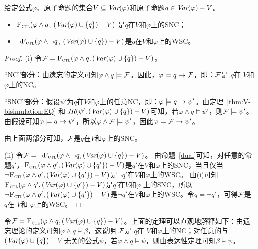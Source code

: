 \begin{theorem}\label{thm:SNC:WSC:forget}
	给定公式$\varphi$、原子命题的集合$V\subseteq\textit{Var}(\varphi)$和原子命题$q\in\textit{Var}(\varphi)- V$。
	\begin{itemize}
		\item[(i)] ${\textsc{F}_{\textsc{ctl}}} (\varphi \land q$, $(\textit{Var}(\varphi) \cup \{q\}) - V)$ 是$q$在$V$和$\varphi$上的SNC；
		\item[(ii)]  $\neg{\textsc{F}_{\textsc{ctl}}} (\varphi \land \neg q$, $(\textit{Var}(\varphi) \cup \{q\}) - V)$是$q$在$V$和$\varphi$上的WSC。
	\end{itemize}
\end{theorem}
\begin{proof}
	(i) 令${\cal F}={\textsc{F}_{\textsc{ctl}}}(\varphi \wedge q, (\textit{Var}(\varphi) \cup \{q\})- V)$。
	
	
	“NC”部分：由遗忘的定义可知$\varphi \wedge q \models {\cal F}$。因此，$\varphi\models q \rightarrow {\cal F}$，即：${\cal F}$是 $q$在 $V$和$\varphi$上的NC。
	
	“SNC”部分：假设$\psi'$为$q$在$V$和$\varphi$上的任意NC，即：$\varphi\models q \rightarrow \psi'$。由定理~\ref{thm:V-bisimulation:EQ} 和 $\emph{IR}(\psi', (\textit{Var}(\varphi) \cup \{q\})- V)$可知，若$\varphi \wedge q \models \psi'$，则${\cal F} \models \psi'$。
	由假设可知$\varphi\models q \rightarrow \psi'$，所以$\varphi \wedge {\cal F} \models \psi'$，因此$\varphi \models {\cal F} \rightarrow \psi'$。
	
	由上面两部分可知，${\cal F}$是$q$在$V$和$\varphi$上的SNC。
	
	(ii) 令${\cal F}=\neg {\textsc{F}_{\textsc{ctl}}}(\varphi \wedge \neg q, (\textit{Var}(\varphi) \cup \{q\})- V)$。
	由命题~\ref{dual}可知，对任意的命题$q'$，${\textsc{F}_{\textsc{ctl}}}(\varphi \wedge q', (\textit{Var}(\varphi) \cup \{q'\})- V)$是$q'$在$V$和$\varphi$上的SNC，当且仅当
	$\neg {\textsc{F}_{\textsc{ctl}}}(\varphi \wedge q', (\textit{Var}(\varphi) \cup \{q'\})- V)$是$\neg q'$在$V$和$\varphi$上的WSC。
	由(i)可知${\textsc{F}_{\textsc{ctl}}}(\varphi \wedge q', (\textit{Var}(\varphi) \cup \{q'\})- V)$是$q'$在$V$和$\varphi$ 上的SNC，所以$\neg {\textsc{F}_{\textsc{ctl}}}(\varphi \wedge q', (\textit{Var}(\varphi) \cup \{q'\})- V)$是$\neg q'$在$V$和$\varphi$上的WSC。令$q=\neg q'$，可得${\cal F}$是 $q$在 $V$和 $\varphi$上的WSC。
\end{proof}

令${\cal F}={\textsc{F}_{\textsc{ctl}}}(\varphi \wedge q, (\textit{Var}(\varphi) \cup \{q\})- V)$。上面的定理可以直观地解释如下：由遗忘理论的定义可知$\varphi \wedge q \models \beta$，这说明
${\cal F}$是 $q$在 $V$和$\varphi$上的NC；对任意的与$(\textit{Var}(\varphi) \cup \{q\})- V$无关的公式$\psi$，若$\varphi \wedge q \models \psi$，则由表达性定理可知$\beta \models \psi$。

